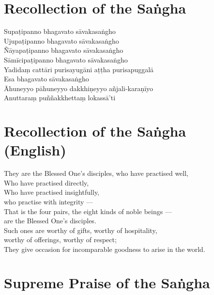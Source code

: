 \section*{Recollection of the Saṅgha}

\begin{leader}
\end{leader}

Supaṭipanno bhagavato sāvakasaṅgho\\
Ujupaṭipanno bhagavato sāvakasaṅgho\\
Ñāyapaṭipanno bhagavato sāvakasaṅgho\\
Sāmīcipaṭipanno bhagavato sāvakasaṅgho\\
Yadidaṃ cattāri purisayugāni aṭṭha purisapuggalā\\
Esa bhagavato sāvakasaṅgho\\
Āhuneyyo pāhuneyyo dakkhiṇeyyo añjali-karaṇīyo\\
Anuttaraṃ puññakkhettaṃ lokassā'ti

\section*{Recollection of the Saṅgha (English)}

\begin{leader}
\end{leader}

They are the Blessed One's disciples, who have practised well,\\
Who have practised directly,\\
Who have practised insightfully,\\
 who practise with integrity ---\\
That is the four pairs, the eight kinds of noble beings ---\\
 are the Blessed One's disciples.\\
Such ones are worthy of gifts, worthy of hospitality,\\
\vin worthy of offerings, worthy of respect;\\
They give occasion for incomparable goodness to arise in the world.

\section*{Supreme Praise of the Saṅgha}

\begin{leader}
\end{leader}


